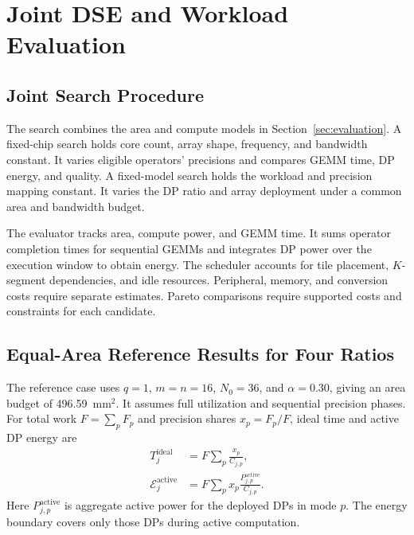 \documentclass[conference,9pt,letterpaper]{IEEEtran}
\begin{document}
\section{Joint DSE and Workload Evaluation}
\label{sec:workload}

\subsection{Joint Search Procedure}
\label{sec:joint_dse}

The search combines the area and compute models in Section~\ref{sec:evaluation}. A fixed-chip search holds core count, array shape, frequency, and bandwidth constant. It varies eligible operators' precisions and compares GEMM time, DP energy, and quality. A fixed-model search holds the workload and precision mapping constant. It varies the DP ratio and array deployment under a common area and bandwidth budget.

The evaluator tracks area, compute power, and GEMM time. It sums operator completion times for sequential GEMMs and integrates DP power over the execution window to obtain energy. The scheduler accounts for tile placement, $K$-segment dependencies, and idle resources. Peripheral, memory, and conversion costs require separate estimates. Pareto comparisons require supported costs and constraints for each candidate.

\subsection{Equal-Area Reference Results for Four Ratios}
\label{sec:k4_simplex}

The reference case uses $q=1$, $m=n=16$, $N_0=36$, and $\alpha=0.30$, giving an area budget of 496.59~mm$^2$. It assumes full utilization and sequential precision phases. For total work $F=\sum_pF_p$ and precision shares $x_p=F_p/F$, ideal time and active DP energy are
\begin{align}
T_j^{\mathrm{ideal}}&=F\sum_p\frac{x_p}{C_{j,p}},
\label{eq:k4_time}\\
\mathcal E_j^{\mathrm{active}}&=F\sum_p x_p\frac{P_{j,p}^{\mathrm{active}}}{C_{j,p}}.
\label{eq:k4_energy}
\end{align}
Here $P_{j,p}^{\mathrm{active}}$ is aggregate active power for the deployed DPs in mode $p$. The energy boundary covers only those DPs during active computation.
\end{document}
